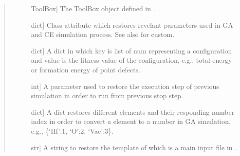 \documentclass[letterpaper,10pt,english]{sphinxmanual}
\begin{document}
\begin{fulllineitems}
\begin{quote}
\begin{description}
\begin{description}
\item[{}] \leavevmode{[}ToolBox{]}
The ToolBox object defined in .

\item[{}] \leavevmode{[}dict{]}
Class attribute which restores revelant parameters used in GA and
CE simulation process. See also  for custom.

\item[{}] \leavevmode{[}dict{]}
A dict in which key is list of num representing a configuration and
value is the fitness value of the configuration, e.g., total energy or
formation energy of point defects.

\item[{}] \leavevmode{[}int{]}
A parameter used to restore the execution step of previous simulation
in order to run from previous stop step.

\item[{}] \leavevmode{[}dict{]}
A dict restores different elements and their responding number index
in order to convert a element to a number in GA simulation, e.g.,
\{‘Hf’:1, ‘O’:2, ‘Vac’:3\}.

\item[{}] \leavevmode{[}str{]}
A string to restore the template of  which is a main
input file in .

\end{description}

\end{description}\end{quote}

\begin{fulllineitems}
\label{\detokenize{pygace:pygace.gace.AbstractApp.DEFAULT_SETUP}}
\end{fulllineitems}



\end{fulllineitems}
\end{document}
